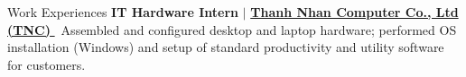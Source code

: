 \begin{rubric}{Work Experiences}
\entry*[07/2025 -- 09/2025]%
    \textbf{IT Hardware Intern} $|$ \href{https://www.tnc.com.vn}{\textbf{Thanh Nhan Computer Co., Ltd (TNC)} \faLink}
    \newline\textbullet\ Assembled and configured desktop and laptop hardware; performed OS installation (Windows) and setup of standard productivity and utility software for customers.
\end{rubric}